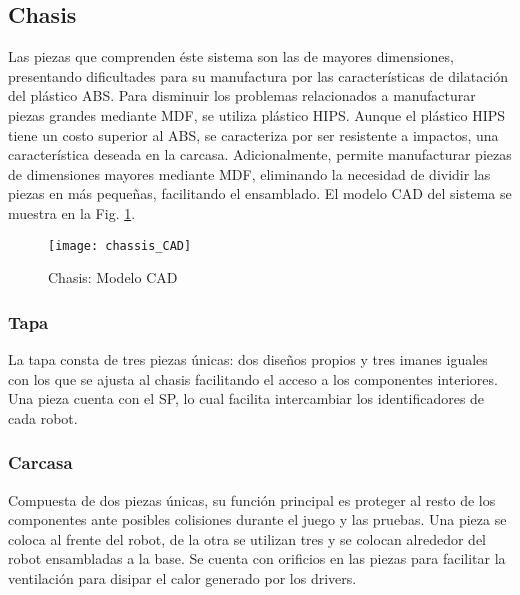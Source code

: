 
\subsection{Chasis}
Las piezas que comprenden éste sistema son las de mayores dimensiones, presentando dificultades para su manufactura por las características de dilatación del plástico \gls{ABS}. Para disminuir los problemas relacionados a manufacturar piezas grandes mediante \gls{MDF}, se utiliza plástico \gls{HIPS}. Aunque el plástico \gls{HIPS} tiene un costo superior al \gls{ABS}, se caracteriza por ser resistente a impactos, una característica deseada en la carcasa. Adicionalmente, permite manufacturar piezas de dimensiones mayores mediante \gls{MDF}, eliminando la necesidad de dividir las piezas en más pequeñas, facilitando el ensamblado. El modelo \gls{CAD} del sistema se muestra en la Fig. \ref{fig:chasis_cad}. 


\begin{figure}
	\centering
		\texttt{[image: chassis\_CAD]}
	\caption{Chasis: Modelo CAD}
	\label{fig:chasis_cad}
\end{figure}
\subsubsection{Tapa} 
La tapa consta de tres piezas únicas: dos diseños propios y tres imanes iguales con los que se ajusta al chasis facilitando el acceso a los componentes interiores. Una pieza cuenta con el \gls{SP}, lo cual facilita intercambiar los identificadores de cada robot. 

\subsubsection{Carcasa}
Compuesta de dos piezas únicas, su función principal es proteger al resto de los componentes ante posibles colisiones durante el juego y las pruebas. Una pieza se coloca al frente del robot, de la otra se utilizan tres y se colocan alrededor del robot ensambladas a la base. Se cuenta con orificios en las piezas para facilitar la ventilación para disipar el calor generado por los drivers.

